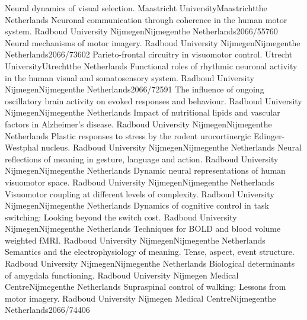 	{Neural dynamics of visual selection.}
	{Maastricht University}{Maastricht}{the Netherlands}{}
	{Neuronal communication through coherence in the human motor system.}
	{Radboud University Nijmegen}{Nijmegen}{the Netherlands}{2066/55760}
	{Neural mechanisms of motor imagery.}
	{Radboud University Nijmegen}{Nijmegen}{the Netherlands}{2066/73602}
	{Parieto-frontal circuitry in visuomotor control.}
	{Utrecht University}{Utrecht}{the Netherlands}{}
	{Functional roles of rhythmic neuronal activity in the human visual and somatosensory system.}
	{Radboud University Nijmegen}{Nijmegen}{the Netherlands}{2066/72591}
	{The influence of ongoing oscillatory brain activity on evoked responses and behaviour.}
	{Radboud University Nijmegen}{Nijmegen}{the Netherlands}{}
	{Impact of nutritional lipids and vascular factors in Alzheimer’s disease.}
	{Radboud University Nijmegen}{Nijmegen}{the Netherlands}{}
	{Plastic responses to stress by the rodent urocortinergic Edinger-Westphal nucleus.}
	{Radboud University Nijmegen}{Nijmegen}{the Netherlands}{}
	{Neural reflections of meaning in gesture, language and action.}
	{Radboud University Nijmegen}{Nijmegen}{the Netherlands}{}
	{Dynamic neural representations of human visuomotor space.}
	{Radboud University Nijmegen}{Nijmegen}{the Netherlands}{}
	{Visuomotor coupling at different levels of complexity.}
	{Radboud University Nijmegen}{Nijmegen}{the Netherlands}{}
	{Dynamics of cognitive control in task switching: Looking beyond the switch cost.}
	{Radboud University Nijmegen}{Nijmegen}{the Netherlands}{}
	{Techniques for BOLD and blood volume weighted fMRI.}
	{Radboud University Nijmegen}{Nijmegen}{the Netherlands}{}
	{Semantics and the electrophysiology of meaning. Tense, aspect, event structure.}
	{Radboud University Nijmegen}{Nijmegen}{the Netherlands}{}
	{Biological determinants of amygdala functioning.}
	{Radboud University Nijmegen Medical Centre}{Nijmegen}{the Netherlands}{}
	{Supraspinal control of walking: Lessons from motor imagery.}
	{Radboud University Nijmegen Medical Centre}{Nijmegen}{the Netherlands}{2066/74406}
